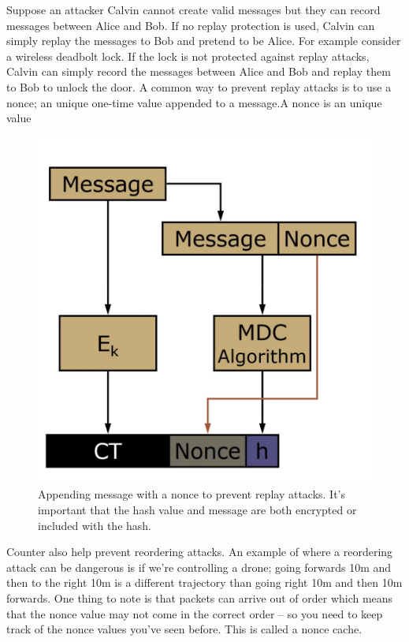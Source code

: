 \documentclass[../notes.tex]{subfiles}
\begin{document}
Suppose an attacker Calvin cannot create valid messages but they can record messages between Alice and Bob. If no replay protection is used, Calvin can simply replay the messages to Bob and pretend to be Alice. 
For example consider a wireless deadbolt lock. If the lock is not protected against replay attacks, Calvin can simply record the messages between Alice and Bob and replay them to Bob to unlock the door.
A common way to prevent replay attacks is to use a nonce; an unique one-time value appended to a message.A nonce is an unique value 
\begin{figure}[H]
    \centering
    \includegraphics[width=0.8\linewidth]{img/image_2023-03-12-19-00-40.png}
    \caption{Appending message with a nonce to prevent replay attacks. It's important that the hash value and message are both encrypted or included with the hash.}
\end{figure}

Counter also help prevent reordering attacks. An example of where a reordering attack can be dangerous is if we're controlling a drone; going forwards 10m and then to the right 10m is a different trajectory than going right 10m and then 10m forwards.
One thing to note is that packets can arrive out of order which means that the nonce value may not come in the correct order -- so you need to keep track of the nonce values you've seen before. This is called a nonce cache.
\end{document}
